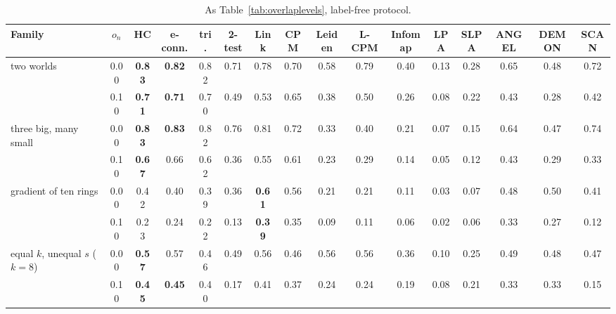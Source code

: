 \begin{table}[t]
\caption{As Table~\ref{tab:overlaplevels}, label-free protocol.}
\label{tab:overlaplevelsfree}
\scriptsize\setlength{\tabcolsep}{2pt}
\begin{ruledtabular}
\begin{tabular}{lccccccccccccccc}
Family & $o_n$ & HC & e-conn. & tri. & 2-test & Link & CPM & Leiden & L-CPM & Infomap & LPA & SLPA & ANGEL & DEMON & SCAN \\
\hline
two worlds & 0.00 & \textbf{0.83} & \textbf{0.82} & 0.82 & 0.71 & 0.78 & 0.70 & 0.58 & 0.79 & 0.40 & 0.13 & 0.28 & 0.65 & 0.48 & 0.72 \\
 & 0.10 & \textbf{0.71} & \textbf{0.71} & 0.70 & 0.49 & 0.53 & 0.65 & 0.38 & 0.50 & 0.26 & 0.08 & 0.22 & 0.43 & 0.28 & 0.42 \\
three big, many small & 0.00 & \textbf{0.83} & \textbf{0.83} & 0.82 & 0.76 & 0.81 & 0.72 & 0.33 & 0.40 & 0.21 & 0.07 & 0.15 & 0.64 & 0.47 & 0.74 \\
 & 0.10 & \textbf{0.67} & 0.66 & 0.62 & 0.36 & 0.55 & 0.61 & 0.23 & 0.29 & 0.14 & 0.05 & 0.12 & 0.43 & 0.29 & 0.33 \\
gradient of ten rings & 0.00 & 0.42 & 0.40 & 0.39 & 0.36 & \textbf{0.61} & 0.56 & 0.21 & 0.21 & 0.11 & 0.03 & 0.07 & 0.48 & 0.50 & 0.41 \\
 & 0.10 & 0.23 & 0.24 & 0.22 & 0.13 & \textbf{0.39} & 0.35 & 0.09 & 0.11 & 0.06 & 0.02 & 0.06 & 0.33 & 0.27 & 0.12 \\
equal $k$, unequal $s$ ($k{=}8$) & 0.00 & \textbf{0.57} & 0.57 & 0.46 & 0.49 & 0.56 & 0.46 & 0.56 & 0.56 & 0.36 & 0.10 & 0.25 & 0.49 & 0.48 & 0.47 \\
 & 0.10 & \textbf{0.45} & \textbf{0.45} & 0.40 & 0.17 & 0.41 & 0.37 & 0.24 & 0.24 & 0.19 & 0.08 & 0.21 & 0.33 & 0.33 & 0.15 \\
\end{tabular}
\end{ruledtabular}
\end{table}
